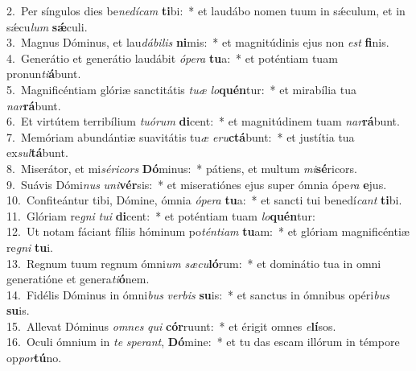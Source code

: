 {2.~}Per síngulos dies be\textit{ne}\textit{dí}\textit{cam} \textbf{ti}bi:~* et laudábo nomen tuum in sǽculum, et in sǽcu\textit{lum} \textbf{sǽ}culi.\\
{3.~}Magnus Dóminus, et lau\textit{dá}\textit{bi}\textit{lis} \textbf{ni}mis:~* et magnitúdinis ejus non \textit{est} \textbf{fi}nis.\\
{4.~}Generátio et generátio laudábit \textit{ó}\textit{pe}\textit{ra} \textbf{tu}a:~* et poténtiam tuam pronun\textit{ti}\textbf{á}bunt.\\
{5.~}Magnificéntiam glóriæ sanctitátis \textit{tu}\textit{æ} \textit{lo}\textbf{quén}tur:~* et mirabília tua \textit{nar}\textbf{rá}bunt.\\
{6.~}Et virtútem terribílium \textit{tu}\textit{ó}\textit{rum} \textbf{di}cent:~* et magnitúdinem tuam \textit{nar}\textbf{rá}bunt.\\
{7.~}Memóriam abundántiæ suavitátis tu\textit{æ} \textit{e}\textit{ru}\textbf{ctá}bunt:~* et justítia tua ex\textit{sul}\textbf{tá}bunt.\\
{8.~}Miserátor, et mi\textit{sé}\textit{ri}\textit{cors} \textbf{Dó}minus:~* pátiens, et multum \textit{mi}\textbf{sé}ricors.\\
{9.~}Suávis Dómi\textit{nus} \textit{u}\textit{ni}\textbf{vér}sis:~* et miseratiónes ejus super ómnia ópe\textit{ra} \textbf{e}jus.\\
{10.~}Confiteántur tibi, Dómine, ómnia \textit{ó}\textit{pe}\textit{ra} \textbf{tu}a:~* et sancti tui benedí\textit{cant} \textbf{ti}bi.\\
{11.~}Glóriam re\textit{gni} \textit{tu}\textit{i} \textbf{di}cent:~* et poténtiam tuam \textit{lo}\textbf{quén}tur:\\
{12.~}Ut notam fáciant fíliis hóminum po\textit{tén}\textit{ti}\textit{am} \textbf{tu}am:~* et glóriam magnificéntiæ re\textit{gni} \textbf{tu}i.\\
{13.~}Regnum tuum regnum ómni\textit{um} \textit{sæ}\textit{cu}\textbf{ló}rum:~* et dominátio tua in omni generatióne et genera\textit{ti}\textbf{ó}nem.\\
{14.~}Fidélis Dóminus in ómni\textit{bus} \textit{ver}\textit{bis} \textbf{su}is:~* et sanctus in ómnibus opéri\textit{bus} \textbf{su}is.\\
{15.~}Allevat Dóminus \textit{om}\textit{nes} \textit{qui} \textbf{cór}ruunt:~* et érigit omnes \textit{e}\textbf{lí}sos.\\
{16.~}Oculi ómnium in \textit{te} \textit{spe}\textit{rant}, \textbf{Dó}mine:~* et tu das escam illórum in témpore op\textit{por}\textbf{tú}no.\\
